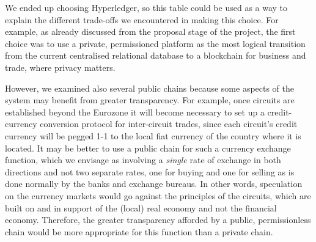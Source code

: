 We ended up choosing Hyperledger, so this table could be used as a way to explain the different trade-offs we encountered in making this choice. For example, as already discussed from the proposal stage of the project, the first choice was to use a private, permissioned platform as the most logical transition from the current centralised relational database to a blockchain for business and trade, where privacy matters.

However, we examined also several public chains because some aspects of the system may benefit from greater transparency. For example, once circuits are established beyond the Eurozone it will become necessary to set up a credit-currency conversion protocol for inter-circuit trades, since each circuit's credit currency will be pegged 1-1 to the local fiat currency of the country where it is located. It may be better to use a public chain for such a currency exchange function, which we envisage as involving a \emph{single} rate of exchange in both directions and not two separate rates, one for buying and one for selling as is done normally by the banks and exchange bureaus. In other words, speculation on the currency markets would go against the principles of the circuits, which are built on and in support of the (local) real economy and not the financial economy. Therefore, the greater transparency afforded by a public, permissionless chain would be more appropriate for this function than a private chain.



